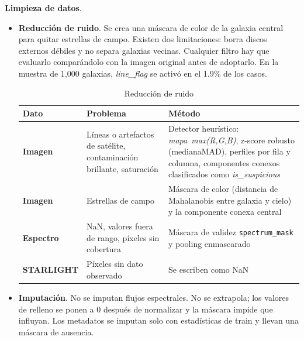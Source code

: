 \documentclass[12pt]{article}
\begin{document}
\textbf{Limpieza de datos}.

\begin{itemize}
    \item \textbf{Reducción de ruido}. Se crea una máscara de color de la galaxia central para quitar estrellas de campo. Existen dos limitaciones: borra discos externos débiles y no separa galaxias vecinas. Cualquier filtro hay que evaluarlo comparándolo con la imagen original antes de adoptarlo. En la muestra de 1,000 galaxias, \textit{line\_flag} se activó en el 1.9\% de los casos.
    
    \begin{table}[H]
        \centering
        \scriptsize
        \begin{tabular}{|p{}|p{}|p{}|}
        \hline
        \textbf{Dato} & \textbf{Problema} & \textbf{Método} \\
        \hline

        \textbf{Imagen} &
        Líneas o artefactos de satélite, contaminación brillante, saturación &
        Detector heurístico: \textit{mapa\ max(R,G,B)}, z-score robusto (mediana\/MAD), perfiles por fila y columna, componentes conexos clasificados como \textit{is\_suspicious} \\ \hline

        \textbf{Imagen} &
        Estrellas de campo &
        Máscara de color (distancia de Mahalanobis entre galaxia y cielo) y la componente conexa central \\ \hline

        \textbf{Espectro} &
        NaN, valores fuera de rango, píxeles sin cobertura &
        Máscara de validez \texttt{spectrum\_mask} y pooling enmascarado \\ \hline

        \textbf{STARLIGHT} &
        Píxeles sin dato observado &
        Se escriben como NaN \\ \hline

        \end{tabular}
        \caption{Reducción de ruido}
        \label{aplicacion}
    \end{table}

    \item \textbf{Imputación}. No se imputan flujos espectrales. No se extrapola; los valores de relleno se ponen a 0 después de normalizar y la máscara impide que influyan. Los metadatos se imputan solo con estadísticas de train y llevan una máscara de ausencia.

\end{itemize}
\end{document}
